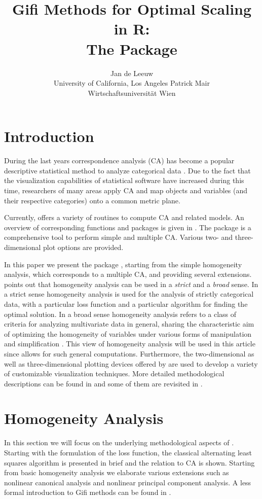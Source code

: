 \documentclass[article]{jss1}
\author{Jan de Leeuw\\University of California, Los Angeles \And 
        Patrick Mair \\Wirtschaftsuniversit\"at Wien}
\title{Gifi Methods for Optimal Scaling in R:\\ The Package \pkg{homals}}
\begin{document}
\section{Introduction}
\label{sec:int}
During the last years correspondence analysis (CA) has become a popular descriptive statistical method to analyze categorical data \citep{Benzecri:73, Greenacre:84, Gifi:90, Greenacre+Blasius:06}. Due to the fact that the visualization capabilities of statistical software have increased during this time, researchers of many areas apply CA and map objects and variables (and their respective categories) onto a common metric plane. 

Currently,  \citep{R:07} offers a variety of routines to compute CA and related models. An overview of corresponding functions and packages is given in \citet{Mair+Hatzinger:07}. The package  \citep{Nenadic+Greenacre:06} is a comprehensive tool to perform simple and multiple CA. Various two- and three-dimensional plot options are provided.  

In this paper we present the  package , starting from the simple homogeneity analysis, which corresponds to a multiple CA, and providing several extensions. \citet{Gifi:90} points out that homogeneity analysis can be used in a \emph{strict} and a \emph{broad} sense. In a strict sense homogeneity analysis is used for the analysis of strictly categorical data, with a particular loss function and a particular algorithm for finding the optimal solution. In a broad sense homogeneity analysis refers to a class of criteria for analyzing multivariate data in general, sharing the characteristic aim of optimizing the homogeneity of variables under various forms of manipulation and simplification \citep[p. 81]{Gifi:90}. This view of homogeneity analysis will be used in this article since  allows for such general computations. Furthermore, the two-dimensional as well as three-dimensional plotting devices offered by  are used to develop a variety of customizable visualization techniques.    
More detailed methodological descriptions can be found in \citet{Gifi:90} and some of them are revisited in \citet{Michailidis+deLeeuw:98}. 


\section{Homogeneity Analysis}
In this section we will focus on the underlying methodological aspects of . Starting with the formulation of the loss function, the classical alternating least squares algorithm is presented in brief and the relation to CA is shown. Starting from basic homogeneity analysis we elaborate various extensions such as nonlinear canonical analysis and nonlinear principal component analysis. A less formal introduction to Gifi methods can be found in \citet{Mair+deLeeuw:2008}. 
\end{document}
